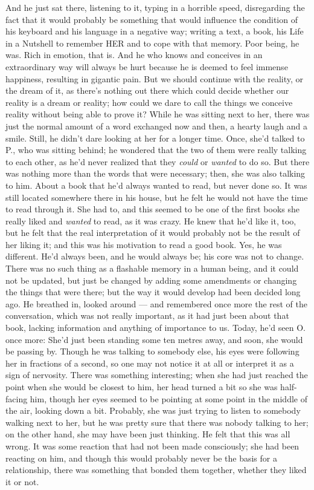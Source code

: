 And he just sat there, listening to it, typing in a horrible speed, disregarding the fact that it would probably be something that would influence the condition of his keyboard and his language in a negative way; writing a text, a book, his Life in a Nutshell to remember HER and to cope with that memory. 
Poor being, he was. 
Rich in emotion, that is. 
And he who knows and conceives in an extraordinary way will always be hurt because he is deemed to feel immense happiness, resulting in gigantic pain. 
But we should continue with the reality, or the dream of it, as there's nothing out there which could decide whether our reality is a dream or reality; how could we dare to call the things we conceive reality without being able to prove it?
While he was sitting next to her, there was just the normal amount of a word exchanged now and then, a hearty laugh and a smile. Still, he didn't dare looking at her for a longer time. Once, she'd talked to P., who was sitting behind; he wondered that the two of them were really talking to each other, as he'd never realized that they \emph{could} or \emph{wanted} to do so. But there was nothing more than the words that were necessary; then, she was also talking to him. 
About a book that he'd always wanted to read, but never done so. It was still located somewhere there in his house, but he felt he would not have the time to read through it. She had to, and this seemed to be one of the first books she really liked and \emph{wanted} to read, as it was crazy. 
He knew that he'd like it, too, but he felt that the real interpretation of it would probably not be the result of her liking it; and this was his motivation to read a good book. 
Yes, he was different. He'd always been, and he would always be; his core was not to change. There was no such thing as a flashable memory in a human being, and it could not be updated, but just be changed by adding some amendments or changing the things that were there; but the way it would develop had been decided long ago. 
He breathed in, looked around --- and remembered once more the rest of the conversation, which was not really important, as it had just been about that book, lacking information and anything of importance to us. Today, he'd seen O. once more: She'd just been standing some ten metres away, and soon, she would be passing by. Though he was talking to somebody else, his eyes were following her in fractions of a second, so one may not notice it at all or interpret it as a sign of nervosity. There was something interesting; when she had just reached the point when she would be closest to him, her head turned a bit so she was half-facing him, though her eyes seemed to be pointing at some point in the middle of the air, looking down a bit. Probably, she was just trying to listen to somebody walking next to her, but he was pretty sure that there was nobody talking to her; on the other hand, she may have been just thinking. He felt that this was all wrong. It was some reaction that had not been made consciously; she had been reacting on him, and though this would probably never be the basis for a relationship, there was something that bonded them together, whether they liked it or not. 
